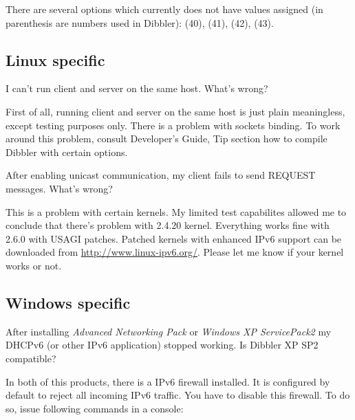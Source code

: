 There are several options which currently does not have values
assigned (in parenthesis are numbers used in Dibbler):
 (40),  (41),  (42),
 (43).

\subsection{Linux specific}

\Q I can't run client and server on the same host. What's wrong?

\A First of all, running client and server on the same host is just
plain meaningless, except testing purposes only. There is a problem
with sockets binding. To work around this problem, consult Developer's
Guide, Tip section how to compile Dibbler with certain options.

\Q After enabling unicast communication, my client fails to send
REQUEST messages. What's wrong?

\A This is a problem with certain kernels. My limited test capabilites
allowed me to conclude that there's problem with 2.4.20
kernel. Everything works fine with 2.6.0 with USAGI patches. Patched 
kernels with enhanced IPv6 support can be downloaded from
\url{http://www.linux-ipv6.org/}. Please let me know if your kernel
works or not.

\subsection{Windows specific}

\Q After installing \emph{Advanced Networking Pack} or \emph{Windows XP
  ServicePack2} my DHCPv6 (or other IPv6 application) stopped
   working. Is Dibbler XP SP2 compatible?

\A In both of this products, there is a IPv6 firewall installed. It
is configured by default to reject all incoming IPv6 traffic. You have
to disable this firewall. To do so, issue following commands in a
console:

\begin{verbatim}

\end{verbatim}

